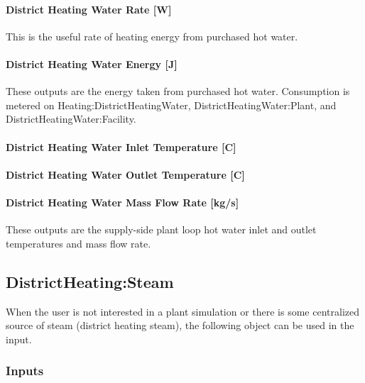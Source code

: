 \paragraph{District Heating Water Rate {[}W{]}}\label{district-heating-hot-water-rate-w}

This is the useful rate of heating energy from purchased hot water.

\paragraph{District Heating Water Energy {[}J{]}}\label{district-heating-hot-water-energy-j}

These outputs are the energy taken from purchased hot water. Consumption is metered on Heating:DistrictHeatingWater, DistrictHeatingWater:Plant, and DistrictHeatingWater:Facility.

\paragraph{District Heating Water Inlet Temperature {[}C{]}}\label{district-heating-inlet-temperature-c}

\paragraph{District Heating Water Outlet Temperature {[}C{]}}\label{district-heating-outlet-temperature-c}

\paragraph{District Heating Water Mass Flow Rate {[}kg/s{]}}\label{district-heating-mass-flow-rate-kgs}

These outputs are the supply-side plant loop hot water inlet and outlet temperatures and mass flow rate.

\subsection{DistrictHeating:Steam}\label{districtheatingsteam}

When the user is not interested in a plant simulation or there is some centralized source of steam (district heating steam), the following object can be used in the input.

\subsubsection{Inputs}\label{inputs-17-006-1}

